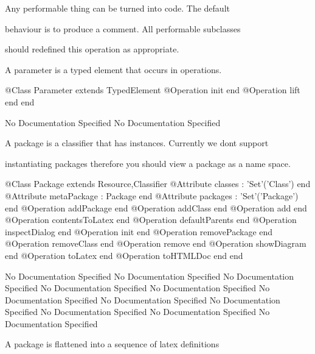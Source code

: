       Any performable thing can be turned into code. The default

      behaviour is to produce a comment. All performable subclasses

      should redefined this operation as appropriate.

      A parameter is a typed element that occurs in operations.
\begin{Interface}
@Class Parameter extends TypedElement
  @Operation init end
  @Operation lift end
end
\end{Interface}
No Documentation Specified
No Documentation Specified

     A package is a classifier that has instances. Currently we dont support

     instantiating packages therefore you should view a package as a name space.
\begin{Interface}
@Class Package extends Resource,Classifier
  @Attribute classes : 'Set'('Class') end
  @Attribute metaPackage : Package end
  @Attribute packages : 'Set'('Package') end
  @Operation addPackage end
  @Operation addClass end
  @Operation add end
  @Operation contentsToLatex end
  @Operation defaultParents end
  @Operation inspectDialog end
  @Operation init end
  @Operation removePackage end
  @Operation removeClass end
  @Operation remove end
  @Operation showDiagram end
  @Operation toLatex end
  @Operation toHTMLDoc end
end
\end{Interface}
No Documentation Specified
No Documentation Specified
No Documentation Specified
No Documentation Specified
No Documentation Specified
No Documentation Specified
No Documentation Specified
No Documentation Specified
No Documentation Specified
No Documentation Specified
No Documentation Specified

    
        A package is flattened into a sequence of latex definitions

